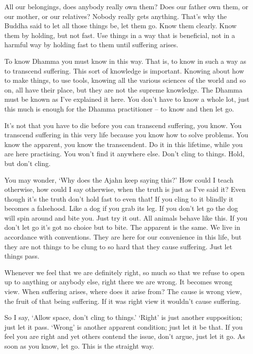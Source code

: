 All our belongings, does anybody really own them? Does our father own them, or our mother, or our relatives? Nobody really gets anything. That's why the Buddha said to let all those things be, let them go. Know them clearly. Know them by holding, but not fast. Use things in a way that is beneficial, not in a harmful way by holding fast to them until suffering arises.

To know Dhamma you must know in this way. That is, to know in such a way as to transcend suffering. This sort of knowledge is important. Knowing about how to make things, to use tools, knowing all the various sciences of the world and so on, all have their place, but they are not the supreme knowledge. The Dhamma must be known as I've explained it here. You don't have to know a whole lot, just this much is enough for the Dhamma practitioner -- to know and then let go.

It's not that you have to die before you can transcend suffering, you know. You transcend suffering in this very life because you know how to solve problems. You know the apparent, you know the transcendent. Do it in this lifetime, while you are here practising. You won't find it anywhere else. Don't cling to things. Hold, but don't cling.

You may wonder, `Why does the Ajahn keep saying this?' How could I teach otherwise, how could I say otherwise, when the truth is just as I've said it? Even though it's the truth don't hold fast to even that! If you cling to it blindly it becomes a falsehood. Like a dog if you grab its leg. If you don't let go the dog will spin around and bite you. Just try it out. All animals behave like this. If you don't let go it's got no choice but to bite. The apparent is the same. We live in accordance with conventions. They are here for our convenience in this life, but they are not things to be clung to so hard that they cause suffering. Just let things pass.

Whenever we feel that we are definitely right, so much so that we refuse to open up to anything or anybody else, right there we are wrong. It becomes wrong view. When suffering arises, where does it arise from? The cause is wrong view, the fruit of that being suffering. If it was right view it wouldn't cause suffering.

So I say, `Allow space, don't cling to things.' `Right' is just another supposition; just let it pass. `Wrong' is another apparent condition; just let it be that. If you feel you are right and yet others contend the issue, don't argue, just let it go. As soon as you know, let go. This is the straight way.

